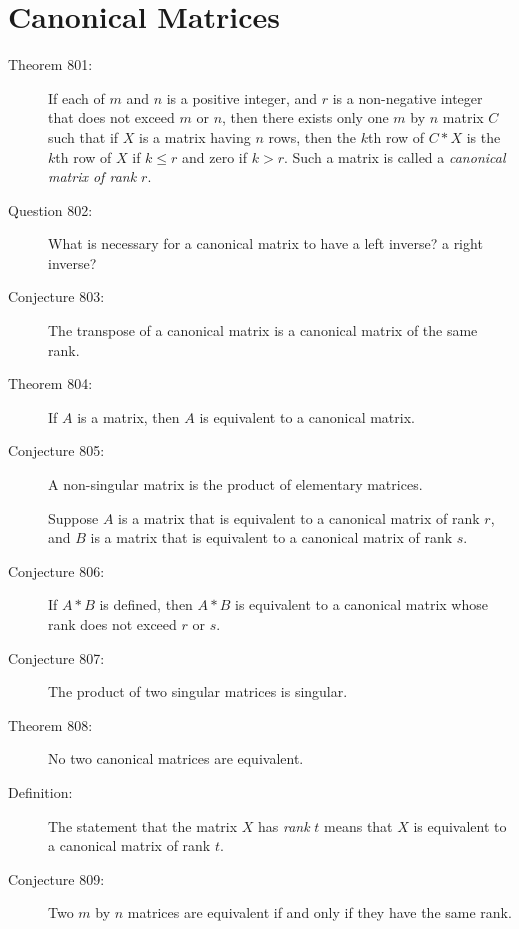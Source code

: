 \documentclass{article}
\begin{document}
\section{Canonical Matrices}

\begin{description}

  \item[Theorem 801:] If each of $m$ and $n$ is a positive integer, and $r$ is a non-negative integer that does not exceed $m$ or $n$, then there exists only one $m$ by $n$ matrix $C$ such that if $X$ is a matrix having $n$ rows, then the $k$th row of $C*X$ is the $k$th row of $X$ if $k \leq r$ and zero if $k > r$. Such a matrix is called a \emph{canonical matrix of rank $r$}.

  \item[Question 802:] What is necessary for a canonical matrix to have a left inverse? a right inverse?

  \item[Conjecture 803:] The transpose of a canonical matrix is a canonical matrix of the same rank.

  \item[Theorem 804:] If $A$ is a matrix, then $A$ is equivalent to a canonical matrix.

  \item[Conjecture 805:] A non-singular matrix is the product of elementary matrices.

  \item[] Suppose $A$ is a matrix that is equivalent to a canonical matrix of rank $r$, and $B$ is a matrix that is equivalent to a canonical matrix of rank $s$.

  \item[Conjecture 806:] If $A*B$ is defined, then $A*B$ is equivalent to a canonical matrix whose rank does not exceed $r$ or $s$.

  \item[Conjecture 807:] The product of two singular matrices is singular.

  \item[Theorem 808:] No two canonical matrices are equivalent.

  \item[Definition:] The statement that the matrix $X$ has \emph{rank} $t$ means that $X$ is equivalent to a canonical matrix of rank $t$.

  \item[Conjecture 809:] Two $m$ by $n$ matrices are equivalent if and only if they have the same rank.


\end{description}
\end{document}
